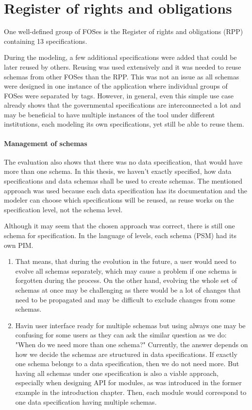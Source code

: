 \section{Register of rights and obligations}

One well-defined group of FOSes is the Register of rights and obligations (RPP) containing 13 specifications.

During the modeling, a few additional specifications were added that could be later reused by others. Reusing was used extensively and it was needed to reuse schemas from other FOSes than the RPP. This was not an issue as all schemas were designed in one instance of the application where individual groups of FOSes were separated by tags. However, in general, even this simple use case already shows that the governmental specifications are interconnected a lot and may be beneficial to have multiple instances of the tool under different institutions, each modeling its own specifications, yet still be able to reuse them.

\paragraph{Management of schemas} The evaluation also shows that there was no data specification, that would have more than one schema. In this thesis, we haven't exactly specified, how data specifications and data schemas shall be used to create schemas. The mentioned approach was used because each data specification has its documentation and the modeler can choose which specifications will be reused, as reuse works on the specification level, not the schema level.

Although it may seem that the chosen approach was correct, there is still one schema for specification. In the language of levels, each schema (PSM) had its own PIM.
\begin{enumerate}
    \item That means, that during the evolution in the future, a user would need to evolve all schemas separately, which may cause a problem if one schema is forgotten during the process. On the other hand, evolving the whole set of schemas at once may be challenging as there would be a lot of changes that need to be propagated and may be difficult to exclude changes from some schemas.
    \item Havin user interface ready for multiple schemas but using always one may be confusing for some users as they can ask the similar question as we do: "When do we need more than one schema?" Currently, the answer depends on how we decide the schemas are structured in data specifications. If exactly one schema belongs to a data specification, then we do not need more. But having all schemas under one specification is also a viable approach, especially when designing API for modules, as was introduced in the former example in the introduction chapter. Then, each module would correspond to one data specification having multiple schemas.
\end{enumerate}

